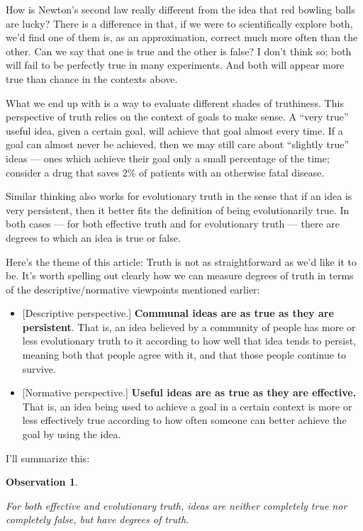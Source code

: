 \documentclass[11pt, oneside]{article}
\newtheorem{obs}{Observation}
\begin{document}
How is Newton's second law really different from the idea that red bowling balls
are
lucky? There is a difference in that, if we were to scientifically explore both,
we'd find one of them is, as an approximation, correct much more often than the
other. Can we say that one is true and the other is false? I don't think so;
both will fail to be perfectly true in many experiments. And both will appear
more true than chance in the contexts above.

What we end up with is a way to evaluate different shades of truthiness.
This perspective of truth relies on the context of goals to make sense.
A ``very true'' useful idea, given
a certain goal, will achieve that goal almost every time. If a goal can
almost never be achieved, then we may still care about ``slightly true'' ideas
--- ones which achieve their goal only a small percentage of the time;
consider a drug that saves 2\% of patients with an otherwise fatal disease.

Similar thinking also works for evolutionary truth in the sense that if an idea
is very persistent, then it better fits the definition of being evolutionarily
true. In both cases --- for both effective truth and for evolutionary truth ---
there are degrees to which an idea is true or false.

Here's the theme of this article:
Truth is not as straightforward as we'd like it to be.
It's worth spelling out clearly how we can measure degrees of truth in terms of
the descriptive/normative viewpoints mentioned earlier:
\begin{itemize}
    \item{} [Descriptive perspective.]
        {\bf Communal ideas are as true as they are
        persistent}.
        That is, an idea believed by a community of people has
        more or less evolutionary truth to it according to how well that
        idea tends to persist, meaning both that people agree with it, and
        that those people continue to survive.
    \item{} [Normative perspective.]
        {\bf Useful ideas are as true as they are effective.}
        That is, an idea being used to achieve a goal in a certain context
        is more or less effectively true according to how often someone can
        better achieve the goal by using the idea.
\end{itemize}

I'll summarize this:
\newcommand{\obstwo}{
    For both
    effective and evolutionary truth,
    ideas are neither completely true nor completely false, but have degrees of
    truth.
}
\begin{obs}\label{o2}
    \obstwo
\end{obs}
\end{document}
